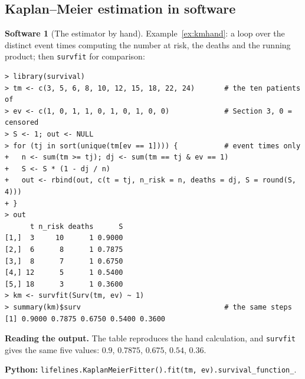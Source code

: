 \documentclass[11pt,a4paper]{article}
\numberwithin{equation}{section}
\theoremstyle{definition}
\newtheorem{software}[thm]{Software}
\begin{document}
\subsection{Kaplan--Meier estimation in software}
\label{ssec:software4}

\begin{software}[The estimator by hand]
\label{sw:kmhand}
Example~\ref{ex:kmhand}: a loop over the distinct event times computing the number at risk, the deaths and the running product; then \texttt{survfit} for comparison:
{\small\begin{verbatim}
> library(survival)
> tm <- c(3, 5, 6, 8, 10, 12, 15, 18, 22, 24)       # the ten patients of
> ev <- c(1, 0, 1, 1, 0, 1, 0, 1, 0, 0)             # Section 3, 0 = censored
> S <- 1; out <- NULL
> for (tj in sort(unique(tm[ev == 1]))) {           # event times only
+   n <- sum(tm >= tj); dj <- sum(tm == tj & ev == 1)
+   S <- S * (1 - dj / n)
+   out <- rbind(out, c(t = tj, n_risk = n, deaths = dj, S = round(S, 4)))
+ }
> out
      t n_risk deaths      S
[1,]  3     10      1 0.9000
[2,]  6      8      1 0.7875
[3,]  8      7      1 0.6750
[4,] 12      5      1 0.5400
[5,] 18      3      1 0.3600
> km <- survfit(Surv(tm, ev) ~ 1)
> summary(km)$surv                                  # the same steps
[1] 0.9000 0.7875 0.6750 0.5400 0.3600
\end{verbatim}}
\textbf{Reading the output.} The table reproduces the hand calculation, and \texttt{survfit} gives the same five values: $0.9$, $0.7875$, $0.675$, $0.54$, $0.36$.

\textbf{Python:} \texttt{lifelines.KaplanMeierFitter().fit(tm, ev).survival\_function\_}.
\end{software}
\end{document}
